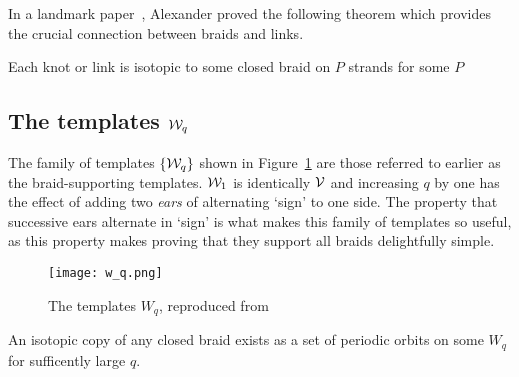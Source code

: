 \documentclass[paper.tex]{subfiles}
\begin{document}

In a landmark paper~\cite{Alexander1923}, Alexander proved the following theorem which provides the crucial connection
between braids and links.


\begin{thm}[Alexander 1923]
  Each knot or link is isotopic to some closed braid on $P$ strands for some $P$
\end{thm}

\subsection{The templates $\mathcal{W}_q$}

The family of templates $\{ \mathcal{W}_q \}$ shown in Figure~\ref{fig:w_q} are those referred to earlier as the braid-supporting templates. $\mathcal{W}_1$ is identically $\mathcal{V}$ and increasing $q$ by one has the effect of adding
two \emph{ears} of alternating `sign' to one side. The property that successive ears alternate in `sign' is what makes this family of templates so useful, as this property makes proving that they support all braids delightfully simple.

\begin{figure}[h]
  \centering
  \texttt{[image: w\_q.png]}
  \caption{The templates $W_q$, reproduced from~\cite{knottyode}}\label{fig:w_q}
\end{figure}


\begin{lemma}[Ghrist 1996]
  An isotopic copy of any closed braid exists as a set of periodic orbits on some $W_q$ for sufficently large $q$.
\end{lemma}
\end{document}
